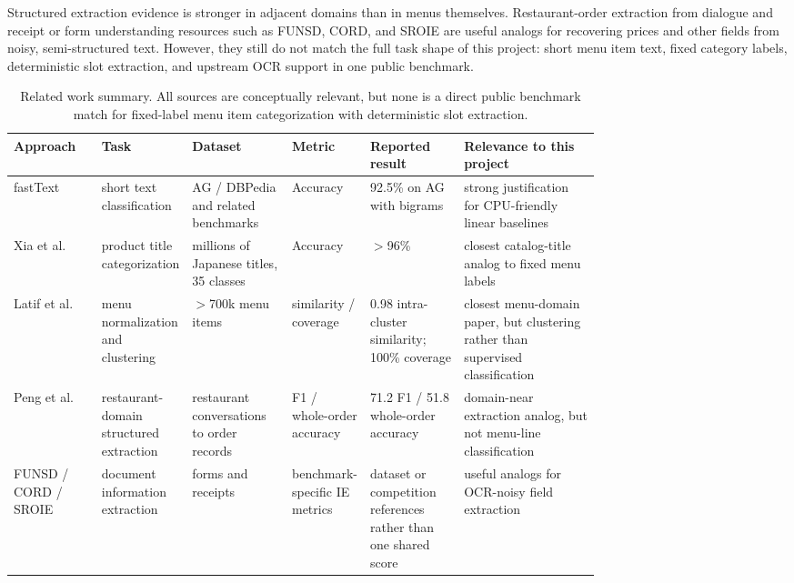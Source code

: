 \documentclass{article}
\begin{document}
Structured extraction evidence is stronger in adjacent domains than in menus
themselves. Restaurant-order extraction from dialogue
\cite{peng-etal-2017-may} and receipt or form understanding resources such as
FUNSD, CORD, and SROIE \cite{jaume2019funsd,park2019cord,huang2019icdar2019}
are useful analogs for recovering prices and other fields from noisy,
semi-structured text. However, they still do not match the full task shape of
this project: short menu item text, fixed category labels, deterministic slot
extraction, and upstream OCR support in one public benchmark.

\begin{table}[t]
\centering
\small
\begin{tabularx}{\linewidth}{p{0.15\linewidth}p{0.15\linewidth}p{0.17\linewidth}p{0.12\linewidth}p{0.16\linewidth}X}
\toprule
Approach & Task & Dataset & Metric & Reported result & Relevance to this project \\
\midrule
fastText \cite{joulin-etal-2017-bag} & short text classification & AG / DBPedia and related benchmarks & Accuracy & 92.5\% on AG with bigrams & strong justification for CPU-friendly linear baselines \\
Xia et al. \cite{xia-etal-2017-large} & product title categorization & millions of Japanese titles, 35 classes & Accuracy & $>$96\% & closest catalog-title analog to fixed menu labels \\
Latif et al. \cite{latif-etal-2025-restaurant} & menu normalization and clustering & $>$700k menu items & similarity / coverage & 0.98 intra-cluster similarity; 100\% coverage & closest menu-domain paper, but clustering rather than supervised classification \\
Peng et al. \cite{peng-etal-2017-may} & restaurant-domain structured extraction & restaurant conversations to order records & F1 / whole-order accuracy & 71.2 F1 / 51.8 whole-order accuracy & domain-near extraction analog, but not menu-line classification \\
FUNSD / CORD / SROIE \cite{jaume2019funsd,park2019cord,huang2019icdar2019} & document information extraction & forms and receipts & benchmark-specific IE metrics & dataset or competition references rather than one shared score & useful analogs for OCR-noisy field extraction \\
\bottomrule
\end{tabularx}
\caption{Related work summary. All sources are conceptually relevant, but none is a direct public benchmark match for fixed-label menu item categorization with deterministic slot extraction.}
\label{tab:related-work}
\end{table}
\end{document}
